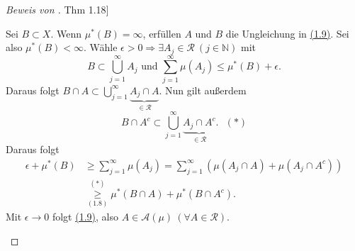\documentclass[a4paper]{report}
\newcommand{\N}{\mathbb{N}}
\newcommand{\jhyperref}[2]{\hyperref[j_#1]{#2}}
\newcommand{\jlink}[1]{\jhyperref{#1}{#1}}
\theoremstyle{plain}
\theoremstyle{definition}
\begin{document}
{{{\begin{proof}[Beweis von \jlink{Thm 1.18}]
\begin{itemize}
                Sei $B \subset X$. Wenn $\mu^*(B)=\infty$, erfüllen $A$ und $B$ die Ungleichung in \jlink{(1.9)}. Sei also $\mu^*(B) < \infty$. Wähle $\epsilon >0 \Rightarrow \exists A_j \in \mathcal{R}\ (j \in \N)$ mit 
                \begin{displaymath}
                    B \subset \bigcup_{j=1}^\infty A_j\text{ und }\sum_{j=1}^\infty \mu(A_j) \le \mu^*(B) + \epsilon.
                \end{displaymath}
                Daraus folgt $B\cap A \subset \bigcup_{j=1}^\infty \underbrace{A_j \cap A}_{\in \mathcal{R}}$. Nun gilt außerdem
                \begin{displaymath}
                    B \cap A^c \subset \bigcup_{j=1}^\infty \underbrace{A_j \cap A^c}_{\in \mathcal{R}}.\ \ \ (*)
                \end{displaymath}
                Daraus folgt
                \begin{displaymath}
                    \begin{split}
                        \epsilon + \mu^*(B) &\ge \sum_{j=1}^\infty \mu(A_j) = \sum_{j=1}^\infty (\mu(A_j \cap A) + \mu(A_j \cap A^c))\\
                        &\overset{(*)}{\underset{\jlink{(1.8)}}{\ge}} \mu^*(B\cap A) + \mu^*(B\cap A^c).
                    \end{split}
                \end{displaymath}
                 Mit $\epsilon \rightarrow 0$ folgt \jlink{(1.9)}, also $A \in \mathcal{A}(\mu) \ (\forall A\in \mathcal{R})$.
        \end{itemize}
\end{proof}


}}}
\end{document}
